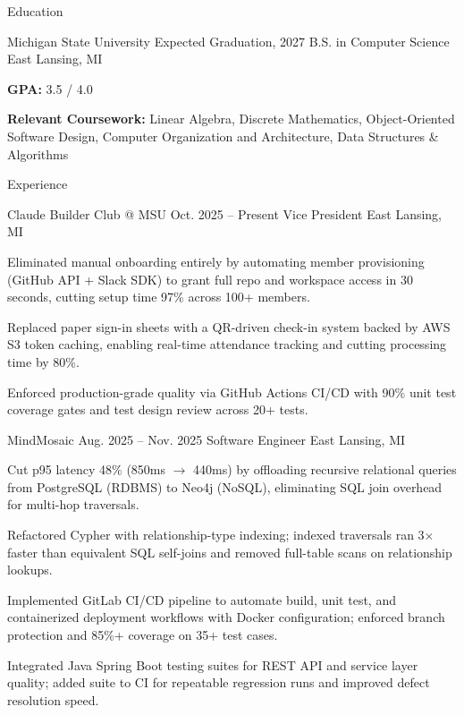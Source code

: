 \documentclass[
	11pt
]{../../../resume}
\begin{document}
	\begin{rSection}{E}{ducation}
		\begin{rSectionEntry}
			{Michigan State University}
			{Expected Graduation, 2027}
			{B.S. in Computer Science}
			{}
			{East Lansing, MI}

			\item \textbf{GPA:} 3.5 / 4.0
			\item \textbf{Relevant Coursework:} Linear Algebra, Discrete Mathematics, Object-Oriented Software Design, Computer Organization and Architecture, Data Structures \& Algorithms
		\end{rSectionEntry}
	\end{rSection}

	\begin{rSection}{E}{xperience}
		\begin{rSectionEntry}
			{Claude Builder Club @ MSU}
			{Oct. 2025 -- Present}
			{Vice President}
			{}
			{East Lansing, MI}

			\item Eliminated manual onboarding entirely by automating member provisioning (GitHub API + Slack SDK) to grant full repo and workspace access in 30 seconds, cutting setup time 97\% across 100+ members.
			\item Replaced paper sign-in sheets with a QR-driven check-in system backed by AWS S3 token caching, enabling real-time attendance tracking and cutting processing time by 80\%.
			\item Enforced production-grade quality via GitHub Actions CI/CD with 90\% unit test coverage gates and test design review across 20+ tests.
		\end{rSectionEntry}

		\begin{rSectionEntry}
			{MindMosaic}
			{Aug. 2025 -- Nov. 2025}
			{Software Engineer}
			{}
			{East Lansing, MI}

			\item Cut p95 latency 48\% (850ms $\rightarrow$ 440ms) by offloading recursive relational queries from PostgreSQL (RDBMS) to Neo4j (NoSQL), eliminating SQL join overhead for multi-hop traversals.
			\item Refactored Cypher with relationship-type indexing; indexed traversals ran 3$\times$ faster than equivalent SQL self-joins and removed full-table scans on relationship lookups.
			\item Implemented GitLab CI/CD pipeline to automate build, unit test, and containerized deployment workflows with Docker configuration; enforced branch protection and 85\%+ coverage on 35+ test cases.
			\item Integrated Java Spring Boot testing suites for REST API and service layer quality; added suite to CI for repeatable regression runs and improved defect resolution speed.
		\end{rSectionEntry}
	\end{rSection}
\end{document}
